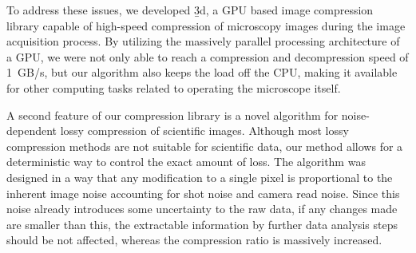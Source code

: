   To address these issues, we developed \b3d, a GPU based image compression library capable of high-speed compression of microscopy images during the image acquisition process. By utilizing the massively parallel processing architecture of a GPU, we were not only able to reach a compression and decompression speed of \SI{1}{GB/s}, but our algorithm also keeps the load off the CPU, making it available for other computing tasks related to operating the microscope itself.

  A second feature of our compression library is a novel algorithm for noise-dependent lossy compression of scientific images. Although most lossy compression methods are not suitable for scientific data, our method allows for a deterministic way to control the exact amount of loss. The algorithm was designed in a way that any modification to a single pixel is proportional to the inherent image noise accounting for shot noise and camera read noise. Since this noise already introduces some uncertainty to the raw data, if any changes made are smaller than this, the extractable information by further data analysis steps should be not affected, whereas the compression ratio is massively increased. 
  







